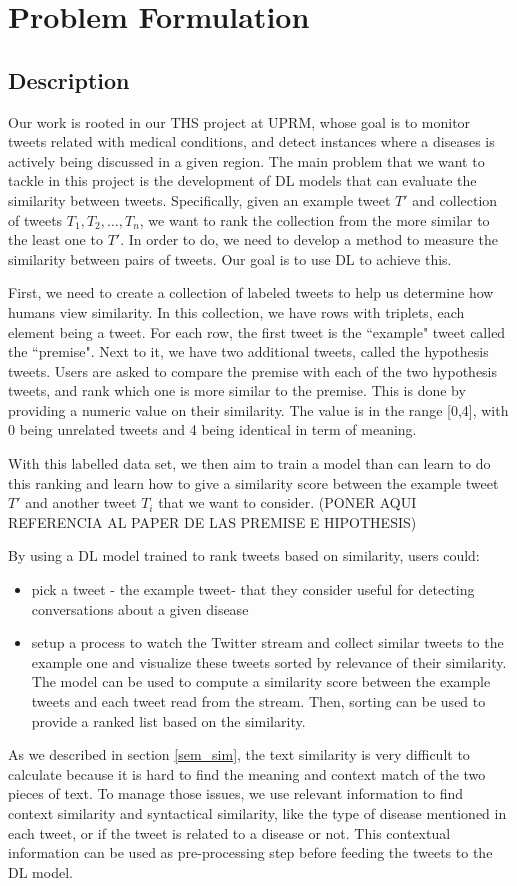\documentclass[12pt]{report}
\begin{document}
\chapter{Problem Formulation} \label{chapter 3}
\section{Description}
Our work is rooted in our \ac{THS} project at UPRM, whose goal is to monitor tweets related with medical conditions, and detect instances where
a diseases is actively being discussed in a given region.
The main problem that we want to tackle in this project is the development of  \ac{DL} models that can evaluate the similarity between
tweets. Specifically, given an example tweet $T'$ and  collection of tweets $T_1, T_2, ..., T_n$, we want to rank the collection 
from the more similar to the least one to $T'$. In order to do, we need to develop a method to measure the similarity between pairs of 
tweets. Our goal is to use \ac{DL} to achieve this. 

First, we need to create a collection of labeled tweets to help us determine how humans 
view similarity. In this collection, we have rows with triplets, each element being a tweet. For each row, the first tweet is the ``example" tweet called the ``premise". Next to it, we have two additional tweets, called the
hypothesis tweets. Users are asked to compare the premise with each of the two hypothesis tweets, and rank which one is more similar to the 
premise. This is done by providing a numeric value on their similarity. The value is in the range [0,4], with 0 being unrelated tweets and 4 being identical in term of meaning.

With this labelled data set, we then aim to train a model than can learn to do this ranking and learn how to give a similarity score between 
the example tweet $T'$ and another tweet $T_i$ that we want to consider. (PONER AQUI REFERENCIA AL PAPER DE LAS PREMISE E HIPOTHESIS)

By using a \ac{DL} model trained to rank tweets based on similarity, users could: 
\begin{itemize}
	\item pick a tweet - the example tweet- that they consider useful for detecting conversations about a given disease 
	\item setup a process to watch the Twitter stream and collect similar tweets to the example one and visualize these tweets  sorted by 
	relevance of their similarity. The model can be used to compute a similarity score between the example tweets and each tweet read from the stream. Then, sorting can be used to provide a ranked list based on the similarity.
\end{itemize} 
As we described in section \ref{sem_sim}, the  text similarity is very difficult to calculate  because it is hard to find the meaning and context match of the two pieces of text. To manage those issues, we use relevant information to find context similarity and syntactical similarity, like the type of disease mentioned in each tweet,  or if the tweet is related to a disease or not. This contextual information can be used as pre-processing step before feeding 
the tweets to the \ac{DL} model.
\end{document}
